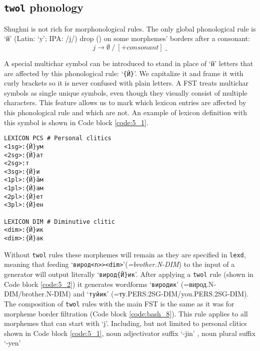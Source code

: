 \subsection{\texttt{twol} phonology}
Shughni is not rich for morphonological rules. The only global phonological rule is `й' (Latin: `y'; IPA: /j/) drop () on some morphemes' borders after a consonant:
\[
j \rightarrow \emptyset 
\ /\ 
[+consonant]
\ \_
\]

A special multichar symbol can be introduced to stand in place of `й' letters that are affected by this phonological rule: `\texttt{\{Й\}}'. We capitalize it and frame it with curly brackets so it is never confused with plain letters. A FST treats multichar symbols as single unique symbols, even though they visually consist of multiple characters. This feature allows us to mark which lexicon entries are affected by this phonological rule and which are not. An example of lexicon definition with this symbol is shown in Code block \ref{code:5_1}.

\begin{code_frame}[float]
    \begin{footnotesize}
    \begin{verbatim}
LEXICON PCS # Personal clitics
<1sg>:{Й}ум
<2sg>:{Й}ат
<2sg>:т
<3sg>:{Й}и
<1pl>:{Й}āм
<1pl>:{Й}ам
<2pl>:{Й}ет
<3pl>:{Й}ен

LEXICON DIM # Diminutive clitic
<dim>:{Й}ик
<dim>:{Й}ак
    \end{verbatim}
    \end{footnotesize}
    \tcblower
    \label{code:5_1}
\end{code_frame}

Without \texttt{twol} rules these morphemes will remain as they are specified in \texttt{lexd}, meaning that feeding `\texttt{вирод<n>><dim>}'(\textit{=brother.N-DIM}) to the input of a generator will output literally `\texttt{вирод\{Й\}ик}'. After applying a \texttt{twol} rule (shown in Code block \ref{code:5_2}) it generates wordforms `\texttt{виродик}' (=вирод.N-DIM/brother.N-DIM) and `\texttt{туйик}' (=ту.PERS.2SG-DIM/you.PERS.2SG-DIM). The composition of \texttt{twol} rules with the main FST is the same as it was for morpheme border filtration (Code block \ref{code:bash_8}). This rule applies to all morphemes that can start with `j'. Including, but not limited to personal clitics shown in Code block \ref{code:5_1}, noun adjectivator suffix `-jin' \parencite[168]{parker_shughni_2023}, noun plural suffix `-yen'

